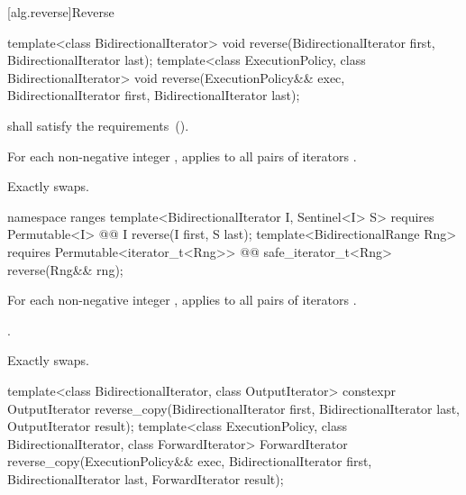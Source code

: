 [alg.reverse]{Reverse}

%
\begin{itemdecl}
template<class BidirectionalIterator>
  void reverse(BidirectionalIterator first, BidirectionalIterator last);
template<class ExecutionPolicy, class BidirectionalIterator>
  void reverse(ExecutionPolicy&& exec,
               BidirectionalIterator first, BidirectionalIterator last);
\end{itemdecl}

\begin{itemdescr}
\pnum
\requires
{} shall satisfy the
 requirements~().

\pnum
\effects
For each non-negative integer
,
applies
to all pairs of iterators
.

\pnum
\complexity
Exactly
swaps.
\end{itemdescr}

\begin{addedblock}
%
\begin{itemdecl}
namespace ranges {
  template<BidirectionalIterator I, Sentinel<I> S>
    requires Permutable<I>
    @@ I reverse(I first, S last);
  template<BidirectionalRange Rng>
    requires Permutable<iterator_t<Rng>>
    @@ safe_iterator_t<Rng> reverse(Rng&& rng);
}
\end{itemdecl}

\begin{itemdescr}
\pnum
\effects
For each non-negative integer
,
applies
to all pairs of iterators
.

\pnum
\returns {}.

\pnum
\complexity
Exactly
swaps.
\end{itemdescr}
\end{addedblock}

%
\begin{itemdecl}
template<class BidirectionalIterator, class OutputIterator>
  constexpr OutputIterator
    reverse_copy(BidirectionalIterator first, BidirectionalIterator last,
                 OutputIterator result);
template<class ExecutionPolicy, class BidirectionalIterator, class ForwardIterator>
  ForwardIterator
    reverse_copy(ExecutionPolicy&& exec,
                 BidirectionalIterator first, BidirectionalIterator last,
                 ForwardIterator result);
\end{itemdecl}

